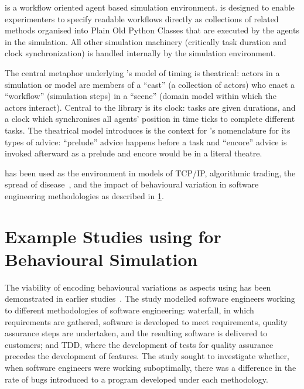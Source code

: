 
\begin{blockquote}
    \theatreag{} is a workflow oriented agent based simulation environment.
\theatreag{} is designed to enable experimenters to specify readable workflows
directly as collections of related methods organised into Plain Old Python
Classes that are executed by the agents in the simulation. All other simulation
machinery (critically task duration and clock synchronization) is handled
internally by the simulation environment.
\end{blockquote}

The central metaphor underlying \theatreag{}'s model of timing is theatrical: actors
in a simulation or model are members of a ``cast'' (a collection of actors) who
enact a ``workflow'' (simulation steps) in a ``scene'' (domain model within
which the actors interact). Central to the library is its clock: tasks are given
durations, and a clock which synchronises all agents' position in time ticks to
complete different tasks. The theatrical model \theatreag{} introduces is the context
for \pdsf{}'s nomenclature for its types of advice: ``prelude'' advice happens
before a task and ``encore'' advice is invoked afterward as a prelude and
encore would be in a literal theatre.

\theatreag{} has been used as the environment in models of TCP/IP, algorithmic
trading, the spread of disease~\cite{aranTheatreThesis}, and the impact of
behavioural variation in software engineering methodologies as described in
\cref{sec:caise_paper}.


\section{Example Studies using \pdsf for Behavioural Simulation}\label{sec:caise_paper}

The viability of encoding behavioural variations as aspects using \pdsf has been
demonstrated in earlier studies~\cite{wallis2018caise,aranTheatreThesis}.
 The study modelled software engineers working to
different methodologies of software engineering: waterfall, in which
requirements are gathered, software is developed to meet requirements, quality
assurance steps are undertaken, and the resulting software is delivered to
customers; and TDD, where the development of tests for quality assurance
precedes the development of features. The study sought to investigate whether,
when software engineers were working suboptimally, there was a difference in the
rate of bugs introduced to a program developed under each methodology.

